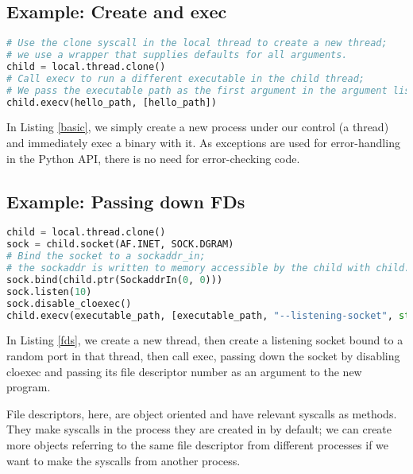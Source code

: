 \documentclass{acmart}
\begin{document}
\subsection{Example: Create and exec}
\begin{lstlisting}[float,language=Python,label={basic},caption={Creating a new process and immediately execing}]
# Use the clone syscall in the local thread to create a new thread;
# we use a wrapper that supplies defaults for all arguments.
child = local.thread.clone()
# Call execv to run a different executable in the child thread;
# We pass the executable path as the first argument in the argument list, as is traditional.
child.execv(hello_path, [hello_path])
\end{lstlisting}
In Listing \ref{basic}, we simply create a new process under our control (a thread)
and immediately exec a binary with it.
As exceptions are used for error-handling in the Python API,
there is no need for error-checking code.
\subsection{Example: Passing down FDs}
\begin{lstlisting}[float,language=Python,label={fds},caption={Passing down FDs}]
child = local.thread.clone()
sock = child.socket(AF.INET, SOCK.DGRAM)
# Bind the socket to a sockaddr_in;
# the sockaddr is written to memory accessible by the child with child.ptr
sock.bind(child.ptr(SockaddrIn(0, 0)))
sock.listen(10)
sock.disable_cloexec()
child.execv(executable_path, [executable_path, "--listening-socket", str(int(sock))])
\end{lstlisting}
In Listing \ref{fds}, we create a new thread,
then create a listening socket bound to a random port in that thread,
then call exec, 
passing down the socket by disabling cloexec and passing its file descriptor number as an argument to the new program.

File descriptors, here, are object oriented and have relevant syscalls as methods.
They make syscalls in the process they are created in by default;
we can create more objects referring to the same file descriptor from different processes
if we want to make the syscalls from another process.
\end{document}
